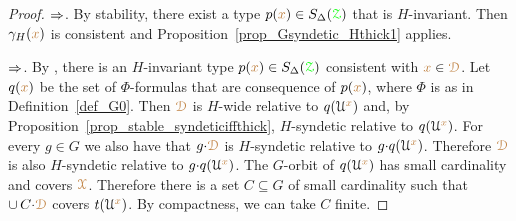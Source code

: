 \begin{proof} 
  $\Rightarrow$.
  By stability, there exist a type $p({\color{brown} x})\in S_\Delta({\color{green}\EuScript Z})$ that is $H$-invariant.
  Then $\gamma_H({\color{brown} x})$ is consistent and Proposition~\ref{prop_Gsyndetic_Hthick1} applies.
  
  $\Rightarrow$.
  By , there is an $H$-invariant type $p({\color{brown} x})\in S_\Delta({\color{green}\EuScript Z})$ consistent with ${\color{brown} x}\in{\color{brown}\EuScript D}$.
  Let $q({\color{brown} x})$ be the set of $\Phi$-formulas that are consequence of $p({\color{brown} x})$, where $\Phi$ is as in Definition~\ref{def_G0}.
  Then ${\color{brown}\EuScript D}$ is $H$-wide relative to $q(\EuScript U^{\color{brown} x})$ and, by Proposition~\ref{prop_stable_syndeticiffthick}, $H$-syndetic relative to $q(\EuScript U^{\color{brown} x})$.
  For every $g\in G$ we also have that $g{\cdot}{\color{brown}\EuScript D}$ is $H$-syndetic relative to $g{\cdot}q(\EuScript U^{\color{brown} x})$.
  Therefore ${\color{brown}\EuScript D}$ is also $H$-syndetic relative to $g{\cdot}q(\EuScript U^{\color{brown} x})$.
  The $G$-orbit of $q(\EuScript U^{\color{brown} x})$ has small cardinality and covers ${\color{brown}\EuScript X}$.
  Therefore there is a set $C\subseteq G$ of small cardinality such that $\cup\,C{\cdot}{\color{brown}\EuScript D}$ covers $t(\EuScript U^{\color{brown} x})$.
  By compactness, we can take $C$ finite.
\end{proof}

